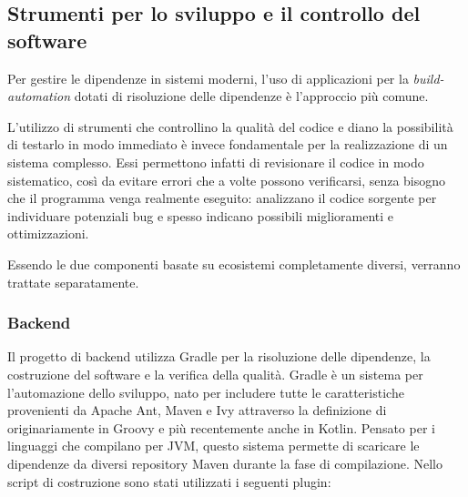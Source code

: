   \subsection{Strumenti per lo sviluppo e il controllo del software}\label{subec:quality}
    Per gestire le dipendenze in sistemi moderni, l'uso di applicazioni per la \emph{build-automation} dotati di risoluzione delle dipendenze è l'approccio più comune.

    L'utilizzo di strumenti che controllino la qualità del codice e diano la possibilità di testarlo in modo immediato è invece fondamentale per la realizzazione di un sistema complesso.
    Essi permettono infatti di revisionare il codice in modo sistematico, così da evitare errori che a volte possono verificarsi, senza bisogno che il programma venga realmente eseguito:
    analizzano il codice sorgente per individuare potenziali bug e spesso indicano possibili miglioramenti e ottimizzazioni.

    Essendo le due componenti basate su ecosistemi completamente diversi, verranno trattate separatamente.

    \subsubsection{Backend}

      Il progetto di backend utilizza Gradle per la risoluzione delle dipendenze, la costruzione del software e la verifica della qualità.
      Gradle è un sistema per l'automazione dello sviluppo, nato per includere tutte le caratteristiche provenienti da Apache Ant, Maven e Ivy attraverso la definizione di  originariamente in Groovy e più recentemente anche in Kotlin.
      Pensato per i linguaggi che compilano per JVM, questo sistema permette di scaricare le dipendenze da diversi repository Maven durante la fase di compilazione.
      Nello script di costruzione sono stati utilizzati i seguenti plugin:

